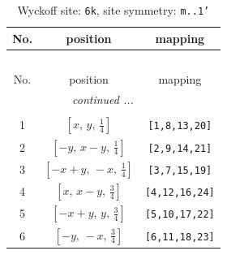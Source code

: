 \documentclass[fleqn,8pt]{jsarticle}
\begin{document}
\renewcommand{\arraystretch}{1.2}
\begin{longtable}{ccc}
\caption{Wyckoff site: {\tt 6k}, site symmetry: {\tt m..1'}}
 \\
 \hline \hline
No. & position & mapping \\ \hline \endfirsthead

\multicolumn{2}{l}{\tablename\ \thetable{}} \\
 \hline \hline
No. & position & mapping \\ \hline \endhead

 \hline \hline
\multicolumn{2}{r}{\footnotesize\it continued ...} \\ \endfoot

 \hline \hline
\multicolumn{2}{r}{} \\ \endlastfoot

1 & $\left[ x,\, y,\, \frac{1}{4} \right]$ & {\tt [1,8,13,20]} \\ \hline
2 & $\left[ - y,\, x - y,\, \frac{1}{4} \right]$ & {\tt [2,9,14,21]} \\ \hline
3 & $\left[ - x + y,\, - x,\, \frac{1}{4} \right]$ & {\tt [3,7,15,19]} \\ \hline
4 & $\left[ x,\, x - y,\, \frac{3}{4} \right]$ & {\tt [4,12,16,24]} \\ \hline
5 & $\left[ - x + y,\, y,\, \frac{3}{4} \right]$ & {\tt [5,10,17,22]} \\ \hline
6 & $\left[ - y,\, - x,\, \frac{3}{4} \right]$ & {\tt [6,11,18,23]} \\
\end{longtable}
\renewcommand{\arraystretch}{1.2}
\end{document}
